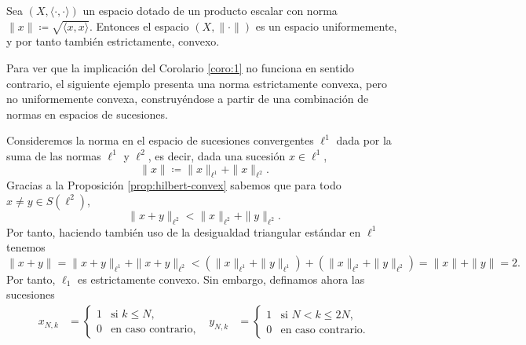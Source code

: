 \begin{proposition} \label{prop:hilbert-convex}
    Sea $ (X, \langle \cdot, \cdot \rangle) $ un espacio dotado de un producto escalar con norma $ \|x\| \coloneq \sqrt{\langle x, x \rangle} $. Entonces el espacio $ (X, \|\cdot\|) $ es un espacio uniformemente, y por tanto también estrictamente, convexo. 
\end{proposition}

Para ver que la implicación del Corolario \ref{coro:1} no funciona en sentido contrario, el siguiente ejemplo presenta una norma estrictamente convexa, pero no uniformemente convexa, construyéndose a partir de una combinación de normas en espacios de sucesiones.

\begin{example}
    Consideremos la norma en el espacio de sucesiones convergentes $ \ell^1 $ dada por la suma de las normas $ \ell^1 $ y $ \ell^2 $, es decir, dada una sucesión $ x \in \ell^1 $,
    \begin{equation}
        \| x \| \coloneq \| x \|_{\ell^1} + \| x \|_{\ell^2}.
    \end{equation}
    Gracias a la Proposición \ref{prop:hilbert-convex} sabemos que para todo $ x \neq y \in S(\ell^2) $,
    \begin{equation}
        \|x+y\|_{\ell^2} < \|x\|_{\ell^2} + \|y\|_{\ell^2}.
    \end{equation}
    Por tanto, haciendo también uso de la desigualdad triangular estándar en $ \ell^1 $ tenemos
    \begin{equation}
        \|x+y\| = \|x+y\|_{\ell^1} + \|x+y\|_{\ell^2} < \left( \|x\|_{\ell^1} + \|y\|_{\ell^1} \right) + \left( \|x\|_{\ell^2} + \|y\|_{\ell^2} \right) = \|x\| + \|y\| = 2.
    \end{equation}
    Por tanto, $ \ell_1 $ es estrictamente convexo. Sin embargo, definamos ahora las sucesiones
    \begin{align}
        x_{N, k} &=
        \begin{cases}
            1 & \text{si } k \leq N, \\
            0 & \text{en caso contrario},
        \end{cases}
        &
        y_{N, k} &=
        \begin{cases}
            1 & \text{si } N < k \leq 2N, \\
            0 & \text{en caso contrario}.
        \end{cases}
    \end{align}

\end{example}
